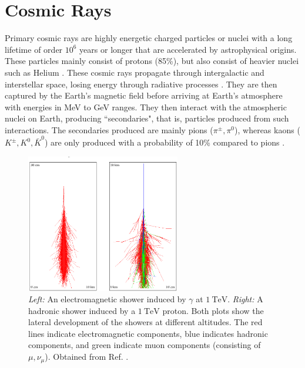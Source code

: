 \documentclass[a4paper]{report}
\numberwithin{equation}{section}
\begin{document}
\section{Cosmic Rays}



Primary cosmic rays are highly energetic charged particles or nuclei with a long lifetime of order $10^6$ years or longer that are accelerated by 
astrophysical origins. These particles mainly consist of protons (85\%), but also consist of heavier nuclei such as Helium \cite{Tanabashi2018}. 
These cosmic rays propagate through intergalactic and interstellar space, losing energy through radiative processes \cite{DeDomenico2012}.
They are then captured by the Earth's magnetic field before arriving at Earth's atmosphere with energies in MeV to GeV ranges. 
They then interact with the atmospheric nuclei on Earth, producing ``secondaries", that is, particles produced from such interactions. The secondaries
produced are mainly pions ($\pi^\pm, \pi^0$), whereas kaons ($K^\pm, K^0, \bar{K}^0$) are only produced with a probability of 10\% compared to pions \cite{Grupen2005}. \par 

\begin{figure}[htb!]
	\centering
	\includegraphics[width=0.6\textwidth]{em_hadronic_showers.png}
	\caption{ \textit{Left:} An electromagnetic shower induced by $\gamma$ at $\SI{1}{\tera\electronvolt}$. 
				\textit{Right: } A hadronic shower induced by a $\SI{1}{\tera\electronvolt}$ proton. Both plots show the lateral
				development of the showers at different altitudes. The red lines indicate electromagnetic components, blue indicates 
				hadronic components, and green indicate muon components (consisting of $\mu, \nu_\mu$). Obtained from Ref. \cite{Haeffner2014}. }
	\label{fig:em_had_showers}
\end{figure}
\end{document}
